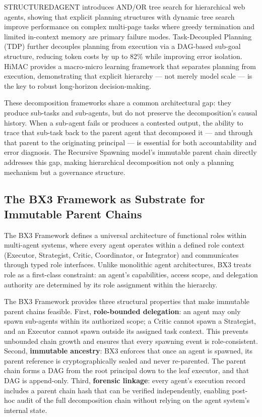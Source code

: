 STRUCTUREDAGENT \cite{structuredagent} introduces AND/OR tree search for hierarchical web agents, showing that explicit planning structures with dynamic tree search improve performance on complex multi-page tasks where greedy termination and limited in-context memory are primary failure modes. Task-Decoupled Planning (TDP) \cite{tdp} further decouples planning from execution via a DAG-based sub-goal structure, reducing token costs by up to 82\% while improving error isolation. HiMAC \cite{himac} provides a macro-micro learning framework that separates planning from execution, demonstrating that explicit hierarchy — not merely model scale — is the key to robust long-horizon decision-making.

These decomposition frameworks share a common architectural gap: they produce sub-tasks and sub-agents, but do not preserve the decomposition's causal history. When a sub-agent fails or produces a contested output, the ability to trace that sub-task back to the parent agent that decomposed it — and through that parent to the originating principal — is essential for both accountability and error diagnosis. The Recursive Spawning model's immutable parent chain directly addresses this gap, making hierarchical decomposition not only a planning mechanism but a governance structure.

\subsection{The BX3 Framework as Substrate for Immutable Parent Chains}

The BX3 Framework \cite{bx3framework} defines a universal architecture of functional roles within multi-agent systems, where every agent operates within a defined role context (Executor, Strategist, Critic, Coordinator, or Integrator) and communicates through typed role interfaces. Unlike monolithic agent architectures, BX3 treats role as a first-class constraint: an agent's capabilities, access scope, and delegation authority are determined by its role assignment within the hierarchy.

The BX3 Framework provides three structural properties that make immutable parent chains feasible. First, \textbf{role-bounded delegation}: an agent may only spawn sub-agents within its authorized scope; a Critic cannot spawn a Strategist, and an Executor cannot spawn outside its assigned task context. This prevents unbounded chain growth and ensures that every spawning event is role-consistent. Second, \textbf{immutable ancestry}: BX3 enforces that once an agent is spawned, its parent reference is cryptographically sealed and never re-parented. The parent chain forms a DAG from the root principal down to the leaf executor, and that DAG is append-only. Third, \textbf{forensic linkage}: every agent's execution record includes a parent chain hash that can be verified independently, enabling post-hoc audit of the full decomposition chain without relying on the agent system's internal state.

